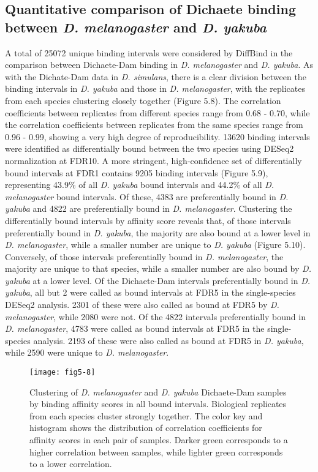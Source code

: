 \subsection{Quantitative comparison of Dichaete binding between \emph{D. melanogaster} and \emph{D. yakuba}}
A total of 25072 unique binding intervals were considered by DiffBind in the comparison between Dichaete-Dam binding in \emph{D. melanogaster} and \emph{D. yakuba}. As with the Dichate-Dam data in \emph{D. simulans}, there is a clear division between the binding intervals in \emph{D. yakuba} and those in \emph{D. melanogaster}, with the replicates from each species clustering closely together (Figure 5.8). The correlation coefficients between replicates from different species range from 0.68 - 0.70, while the correlation coefficients between replicates from the same species range from 0.96 - 0.99, showing a very high degree of reproducibility. 13620 binding intervals were identified as differentially bound between the two species using DESeq2 normalization at FDR10. A more stringent, high-confidence set of differentially bound intervals at FDR1 contains 9205 binding intervals (Figure 5.9), representing 43.9\% of all \emph{D. yakuba} bound intervals and 44.2\% of all \emph{D. melanogaster} bound intervals. Of these, 4383 are preferentially bound in \emph{D. yakuba} and 4822 are preferentially bound in \emph{D. melanogaster}. Clustering the differentially bound intervals by affinity score reveals that, of those intervals preferentially bound in \emph{D. yakuba}, the majority are also bound at a lower level in \emph{D. melanogaster}, while a smaller number are unique to \emph{D. yakuba} (Figure 5.10). Conversely, of those intervals preferentially bound in \emph{D. melanogaster}, the majority are unique to that species, while a smaller number are also bound by \emph{D. yakuba} at a lower level. Of the Dichaete-Dam intervals preferentially bound in \emph{D. yakuba}, all but 2 were called as bound intervals at FDR5 in the single-species DESeq2 analysis. 2301 of these were also called as bound at FDR5 by \emph{D. melanogaster}, while 2080 were not. Of the 4822 intervals preferentially bound in \emph{D. melanogaster}, 4783 were called as bound intervals at FDR5 in the single-species analysis. 2193 of these were also called as bound at FDR5 in \emph{D. yakuba}, while 2590 were unique to \emph{D. melanogaster}.

\begin{figure}
\centering
\texttt{[image: fig5-8]}
\caption[Clustering of \emph{D. melanogaster} and \emph{D. yakuba} Dichaete-Dam samples by binding affinity scores in all bound intervals]{Clustering of \emph{D. melanogaster} and \emph{D. yakuba} Dichaete-Dam samples by binding affinity scores in all bound intervals. Biological replicates from each species cluster strongly together. The color key and histogram shows the distribution of correlation coefficients for affinity scores in each pair of samples. Darker green corresponds to a higher correlation between samples, while lighter green corresponds to a lower correlation.}
\label{Figure 5.8}
\end{figure}

